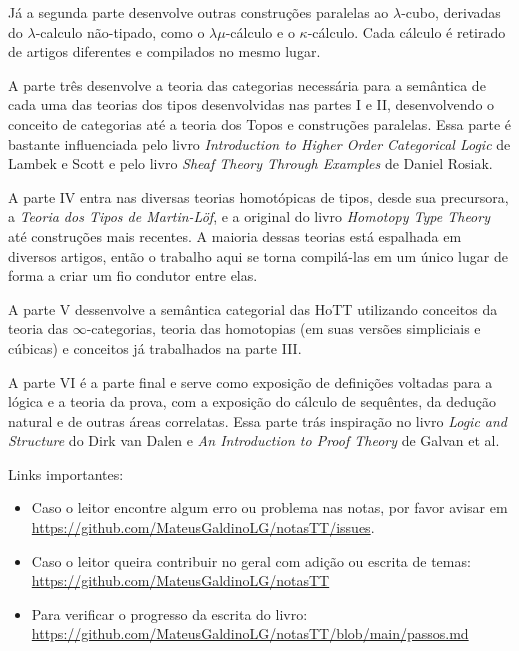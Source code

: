 \documentclass[../main.tex]{subfiles}
\begin{document}
Já a segunda parte desenvolve outras construções paralelas ao $\lambda$-cubo, derivadas do $\lambda$-calculo não-tipado, como o $\lambda\mu$-cálculo e o $\kappa$-cálculo. Cada cálculo é retirado de artigos diferentes e compilados no mesmo lugar.

A parte três desenvolve a teoria das categorias necessária para a semântica de cada uma das teorias dos tipos desenvolvidas nas partes I e II, desenvolvendo o conceito de categorias até a teoria dos Topos e construções paralelas. Essa parte é bastante influenciada pelo livro \emph{Introduction to Higher Order Categorical Logic} de Lambek e Scott e pelo livro \emph{Sheaf Theory Through Examples} de Daniel Rosiak.

A parte IV entra nas diversas teorias homotópicas de tipos, desde sua precursora, a \emph{Teoria dos Tipos de Martin-Löf}, e a original do livro \emph{Homotopy Type Theory} até construções mais recentes. A maioria dessas teorias está espalhada em diversos artigos, então o trabalho aqui se torna compilá-las em um único lugar de forma a criar um fio condutor entre elas.

A parte V dessenvolve a semântica categorial das HoTT utilizando conceitos da teoria das $\infty$-categorias, teoria das homotopias (em suas versões simpliciais e cúbicas) e conceitos já trabalhados na parte III. 

A parte VI é a parte final e serve como exposição de definições voltadas para a lógica e a teoria da prova, com a exposição do cálculo de sequêntes, da dedução natural e de outras áreas correlatas. Essa parte trás inspiração no livro \emph{Logic and Structure} do Dirk van Dalen e \emph{An Introduction to Proof Theory} de Galvan et al.

Links importantes:

\begin{itemize}
    \item Caso o leitor encontre algum erro ou problema nas notas, por favor avisar em \url{https://github.com/MateusGaldinoLG/notasTT/issues}.
    \item Caso o leitor queira contribuir no geral com adição ou escrita de temas: \url{https://github.com/MateusGaldinoLG/notasTT}
    \item Para verificar o progresso da escrita do livro: \url{https://github.com/MateusGaldinoLG/notasTT/blob/main/passos.md}
\end{itemize}
\end{document}
